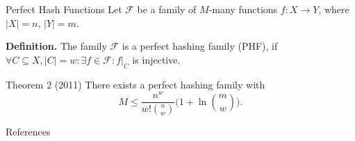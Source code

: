 \documentclass[10pt]{beamer}
\newcommand\restr[2]{\ensuremath{\left.#1\right|_{#2}}}
\begin{document}
\begin{frame}[fragile]{Perfect Hash Functions}
    Let $ \mathcal{F} $ be a family of $ M $-many functions $ f : X \to Y $, where
    $ |X| = n $, $ |Y| = m $.
    
    \textbf{Definition.} The family $ \mathcal{F} $ is a perfect hashing family (PHF), if
    $ \forall C \subseteq X, |C| = w: \exists f \in \mathcal{F}: \restr{f}{C} $ is injective.

    \vfill

    \begin{block}{Theorem 2 (2011)}
        There exists a perfect hashing family with
        \[
            M \leq \frac{n^w}{w!{n \choose w}}\bigg(1 + \ln{m \choose w}\bigg).
        \]
    \end{block}
\end{frame}




\begin{frame}[allowframebreaks]{References}
    \nocite{*}
    
    
\end{frame}
\end{document}
